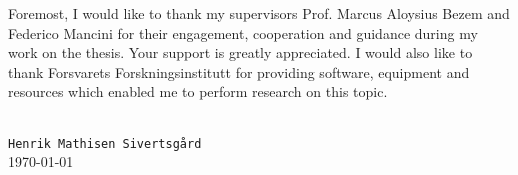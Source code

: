 \begin{acknowledgments}
  Foremost, I would like to thank my supervisors Prof. Marcus Aloysius Bezem and Federico Mancini for their engagement, cooperation and guidance during my work on the thesis. Your support is greatly appreciated. I would also like to thank Forsvarets Forskningsinstitutt for providing software, equipment and resources which enabled me to perform research on this topic.
  \begin{flushright}
    \mbox{}\\[0.5cm]
    \texttt{Henrik Mathisen Sivertsgård}\\
    \today
  \end{flushright}
\end{acknowledgments}
